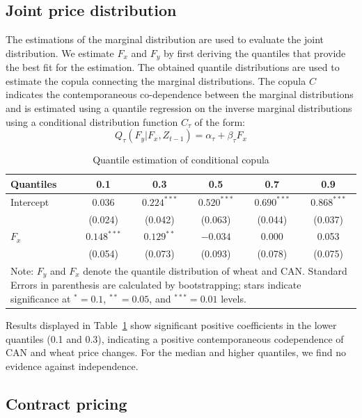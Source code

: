 \documentclass[12pt,a4paper]{article}
\begin{document}
\subsection{Joint price distribution}

The estimations of the marginal distribution are used to evaluate the joint distribution. We estimate $F_x$ and $F_y$ by first deriving the quantiles that provide the best fit for the estimation. The obtained quantile distributions are used to estimate the copula connecting the marginal distributions. The copula $C$ indicates the contemporaneous co-dependence between the marginal distributions and is estimated using a quantile regression on the inverse marginal distributions using a conditional distribution function $C_\tau$ of the form:
\begin{equation}
Q_\tau(F_y | F_x, Z_{t-1}) = \alpha_\tau + \beta_\tau F_x
\label{eq:copula_est}
\end{equation}

\begin{table}[H]
\centering
\caption{Quantile estimation of conditional copula}
\label{tab:copula}
\begin{tabular}{lccccc}
\toprule
Quantiles & 0.1 & 0.3 & 0.5 & 0.7 & 0.9 \\
\midrule
Intercept & 0.036 & $0.224^{***}$ & $0.520^{***}$ & $0.690^{***}$ & $0.868^{***}$ \\
 & (0.024) & (0.042) & (0.063) & (0.044) & (0.037) \\
$F_x$ & $0.148^{***}$ & $0.129^{**}$ & $-0.034$ & 0.000 & 0.053 \\
 & (0.054) & (0.073) & (0.093) & (0.078) & (0.075) \\
\bottomrule
\multicolumn{6}{p{12cm}}{\footnotesize Note: $F_y$ and $F_x$ denote the quantile distribution of wheat and CAN. Standard Errors in parenthesis are calculated by bootstrapping; stars indicate significance at $^{*} = 0.1$, $^{**} = 0.05$, and $^{***} = 0.01$ levels.}
\end{tabular}
\end{table}

Results displayed in Table~\ref{tab:copula} show significant positive coefficients in the lower quantiles (0.1 and 0.3), indicating a positive contemporaneous codependence of CAN and wheat price changes. For the median and higher quantiles, we find no evidence against independence.

\subsection{Contract pricing}
\end{document}
